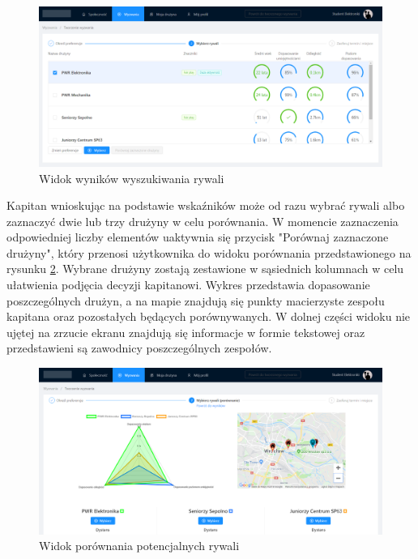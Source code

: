 \begin{figure}[H]
\centering
\includegraphics[width=\linewidth]{065-dzialanie/rys/ss-search-2.PNG}
\caption{Widok wyników wyszukiwania rywali}
\label{fig:ss-search-2}
\end{figure}

Kapitan wnioskując na podstawie wskaźników może od razu wybrać rywali albo zaznaczyć dwie lub trzy drużyny w celu porównania. W momencie zaznaczenia odpowiedniej liczby elementów uaktywnia się przycisk "Porównaj zaznaczone drużyny", który przenosi użytkownika do widoku porównania przedstawionego na rysunku \ref{fig:ss-search-4}. Wybrane drużyny zostają zestawione w sąsiednich kolumnach w celu ułatwienia podjęcia decyzji kapitanowi. Wykres przedstawia dopasowanie poszczególnych drużyn, a na mapie znajdują się punkty macierzyste zespołu kapitana oraz pozostałych będących porównywanych. W dolnej części widoku nie ujętej na zrzucie ekranu znajdują się informacje w formie tekstowej oraz przedstawieni są zawodnicy poszczególnych zespołów.

\begin{figure}[H]
\centering
\includegraphics[width=\linewidth]{065-dzialanie/rys/ss-search-4.PNG}
\caption{Widok porównania potencjalnych rywali}
\label{fig:ss-search-4}
\end{figure}

